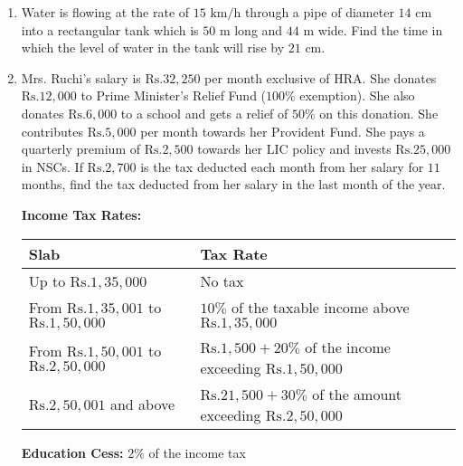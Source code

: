 \documentclass[12pt]{article}
\begin{document}
\begin{enumerate}
\item Water is flowing at the rate of $15 \text{ km/h}$ through a pipe of diameter $14 \text{ cm}$ into a rectangular tank which is $50 \text{ m}$ long and $44 \text{ m}$ wide. Find the time in which the level of water in the tank will rise by $21 \text{ cm}$.

\item Mrs. Ruchi's salary is $\text{Rs.} 32,250$ per month exclusive of HRA. She donates $\text{Rs.} 12,000$ to Prime Minister's Relief Fund ($100\%$ exemption). She also donates $\text{Rs.} 6,000$ to a school and gets a relief of $50\%$ on this donation. She contributes $\text{Rs.} 5,000$ per month towards her Provident Fund. She pays a quarterly premium of $\text{Rs.} 2,500$ towards her LIC policy and invests $\text{Rs.} 25,000$ in NSCs. If $\text{Rs.} 2,700$ is the tax deducted each month from her salary for $11$ months, find the tax deducted from her salary in the last month of the year.

\textbf{Income Tax Rates:}

\begin{tabular}{|l|l|}
\hline
Slab & Tax Rate \\
\hline
Up to $\text{Rs.} 1,35,000$ & No tax \\
\hline
From $\text{Rs.} 1,35,001$ to $\text{Rs.} 1,50,000$ & $10\%$ of the taxable income above $\text{Rs.} 1,35,000$ \\
\hline
From $\text{Rs.} 1,50,001$ to $\text{Rs.} 2,50,000$ & $\text{Rs.} 1,500 + 20\%$ of the income exceeding $\text{Rs.} 1,50,000$ \\
\hline
$\text{Rs.} 2,50,001$ and above & $\text{Rs.} 21,500 + 30\%$ of the amount exceeding $\text{Rs.} 2,50,000$ \\
\hline
\end{tabular}

\textbf{Education Cess:} $2\%$ of the income tax


\end{enumerate}
\end{document}
